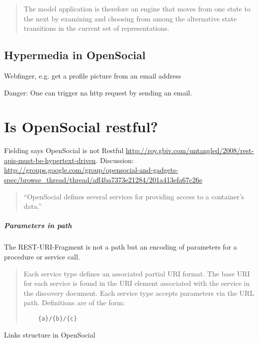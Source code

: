 \documentclass[12pt,a4paper]{scrartcl}		%
\begin{document}

\begin{quotation}
  The model application is therefore an engine that moves from one state to the next by examining and choosing from among the alternative state transitions in the current set of representations.
\end{quotation}\cite[sec. 5.3, p.103]{Fielding2000}

\subsection{Hypermedia in OpenSocial}

Webfinger, e.g. get a profile picture from an email address

Danger: One can trigger na http request by sending an email.

\section{Is OpenSocial restful?}

Fielding says OpenSocial is not Restful \url{http://roy.gbiv.com/untangled/2008/rest-apis-must-be-hypertext-driven}. Discussion: \url{http://groups.google.com/group/opensocial-and-gadgets-spec/browse_thread/thread/aff4ba7373e21284/201a413efa67c26e}


\begin{quote}
  ``OpenSocial defines several services for providing access to a container's data.''
\end{quote}\cite[Social API Server, sec 2, Services]{OSSpec2.0.1}


\subparagraph{Parameters in path}
The REST-URI-Fragment is not a path but an encoding of parameters for a procedure or service call.

\begin{quote}
  Each service type defines an associated partial URI format. The base URI for each service is found in the URI element associated with the service in the discovery document. Each service type accepts parameters via the URL path. Definitions are of the form:
  \begin{verbatim}
    {a}/{b}/{c}
  \end{verbatim}
\end{quote}\cite[Core API Server, sec 2.1.1.2.2, REST-URI-Fragment]{OSSpec2.0.1}

Links structure in OpenSocial
\end{document}
